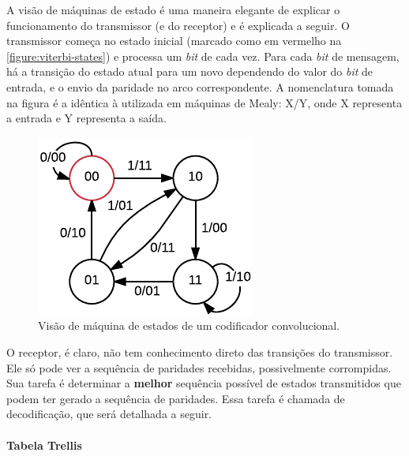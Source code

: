	A visão de máquinas de estado é uma maneira elegante de explicar o funcionamento do transmissor (e do receptor) e é explicada a seguir. O transmissor começa no estado inicial (marcado como em vermelho na \autoref{figure:viterbi-states}) e processa um \textit{bit} de cada vez. Para cada \textit{bit} de mensagem, há a transição do estado atual para um novo dependendo do valor do \textit{bit} de entrada, e o envio da paridade no arco correspondente. A nomenclatura tomada na figura é a idêntica à utilizada em máquinas de Mealy: X/Y, onde X representa a entrada e Y representa a saída.
	\begin{figure}[htb]
		\caption{\label{figure:viterbi-states}Visão de máquina de estados de um codificador convolucional.}
		\centering
		\includegraphics[width=0.25\textheight]{viterbi/states.pdf}
	\end{figure}
	O receptor, é claro, não tem conhecimento direto das transições do transmissor. Ele só pode ver a sequência de paridades recebidas, possivelmente corrompidas. Sua tarefa é determinar a \textbf{melhor} sequência possível de estados transmitidos que podem ter gerado a sequência de paridades. Essa tarefa é chamada de decodificação, que será detalhada a seguir.
	
	\paragraph{Tabela Trellis}


